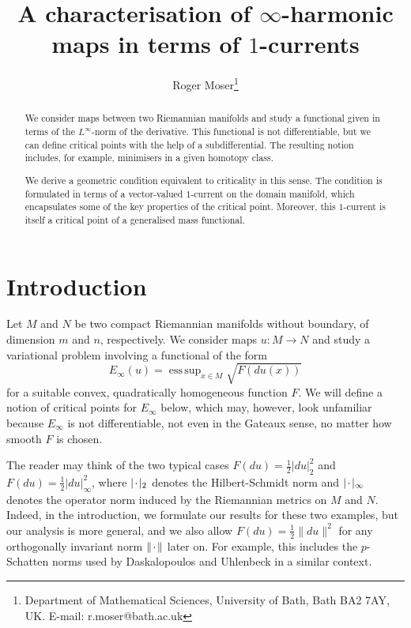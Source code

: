 \documentclass[a4paper]{article}
\DeclareMathOperator*{\esssup}{ess \, sup}
\newcommand{\blank}{{\mkern 2mu\cdot\mkern 2mu}}
\theoremstyle{definition}
\theoremstyle{remark}
\begin{document}
\title{A characterisation of $\infty$-harmonic maps in terms of $1$-currents}

\author{Roger Moser\footnote{Department of Mathematical Sciences,
University of Bath, Bath BA2 7AY, UK.
E-mail: r.moser@bath.ac.uk}}

\maketitle


\begin{abstract}
We consider maps between two Riemannian manifolds and study a functional
given in terms of the $L^\infty$-norm of the derivative.
This functional is not differentiable, but we can define critical points with
the help of a subdifferential. The resulting notion includes, for example, minimisers in a given
homotopy class.

We derive a geometric condition equivalent to criticality in this sense.
The condition is formulated in terms of a vector-valued $1$-current on
the domain manifold, which encapsulates some of the key properties of
the critical point. Moreover, this $1$-current is itself a critical point of a
generalised mass functional.
\end{abstract}




\section{Introduction}

Let $M$ and $N$ be two compact Riemannian manifolds without boundary, of dimension $m$ and $n$, respectively.
We consider maps $u \colon M \to N$ and study a variational problem involving a functional of the form
\[
E_\infty(u) = \esssup_{x \in M} \sqrt{F(du(x))}
\]
for a suitable convex, quadratically homogeneous function $F$. We will define a notion of critical points for
$E_\infty$ below, which may, however, look unfamiliar because $E_\infty$ is not differentiable,
not even in the Gateaux sense, no matter how smooth $F$ is chosen.

The reader may think of the two typical cases $F(du) = \frac{1}{2} |du|_2^2$ and
$F(du) = \frac{1}{2} |du|_\infty^2$, where $|\blank|_2$ denotes the Hilbert-Schmidt norm and $|\blank|_\infty$ denotes the operator norm induced by the Riemannian metrics on $M$ and $N$. Indeed, in the introduction, we formulate our results for these two
examples, but our analysis is more general, and we also allow $F(du) = \frac{1}{2} \|du\|^2$ for any orthogonally
invariant norm $\|\blank\|$ later on. For example, this includes the $p$-Schatten norms used by
Daskalopoulos and Uhlenbeck \cite{Daskalopoulos-Uhlenbeck:24} in a similar context.
\end{document}
